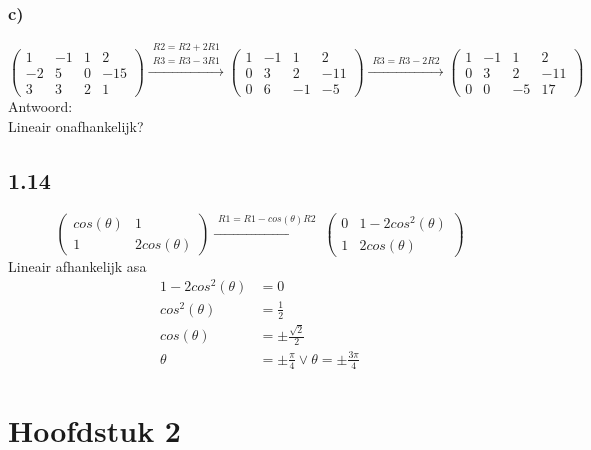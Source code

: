 \documentclass[11pt]{article}
\begin{document}
\subsubsection*{c)}
\[
\begin{pmatrix}
  1 & -1 & 1 & 2 \\
  -2 & 5 & 0 & -15 \\
  3 & 3 & 2 & 1
 \end{pmatrix}
 \overset{\begin{matrix}
  R2 = R2+2R1\\
  R3 = R3-3R1
 \end{matrix}}{\rightarrow}
 \begin{pmatrix}
  1 & -1 & 1 & 2 \\
  0 & 3 & 2 & -11 \\
  0 & 6 & -1 & -5
 \end{pmatrix}
 \overset{\begin{matrix}
  R3 = R3-2R2
 \end{matrix}}{\rightarrow}
 \begin{pmatrix}
  1 & -1 & 1 & 2 \\
  0 & 3 & 2 & -11 \\
  0 & 0 & -5 & 17
 \end{pmatrix}
\]
Antwoord:\\
Lineair onafhankelijk?

\subsection*{1.14}
\[
 \begin{pmatrix}
  cos(\theta) & 1\\
  1 & 2cos(\theta)
 \end{pmatrix}
 \overset{\begin{matrix}
  R1 = R1-cos(\theta)R2
 \end{matrix}}{\rightarrow}
 \begin{pmatrix}
  0 & 1-2cos^2(\theta)\\
  1 & 2cos(\theta)
 \end{pmatrix}
\]
Lineair afhankelijk asa
\begin{align*}
1-2cos^2(\theta) &= 0\\
cos^2(\theta) &= \frac{1}{2}\\
cos(\theta) &= \pm\frac{\sqrt{2}}{2}\\
\theta &= \pm\frac{\pi}{4} \vee \theta = \pm\frac{3\pi}{4}
\end{align*}


\section*{Hoofdstuk 2}
\end{document}
